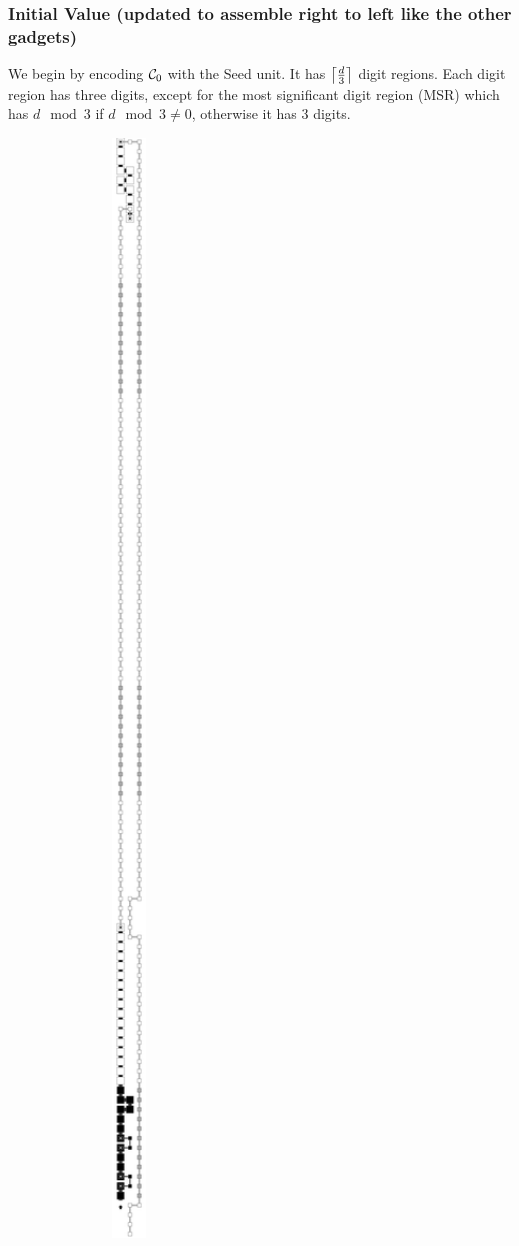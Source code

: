 \subsubsection{Initial Value (updated to assemble right to left like the other gadgets)}
We begin by encoding $\counterstart$ with the Seed unit. It has $\ceil*{\frac{d}{3}}$ digit regions.
Each digit region has three digits, except for the most significant digit region (MSR) which has $d \mod 3$
if $d \mod 3 \not= 0$, otherwise it has 3 digits.

\begin{figure}[H]
    \centering
    \begin{subfigure}[t]{0.24\textwidth}
        \centering
        \includegraphics[width=0.24\textwidth]{initial_value_case1_msr}

\end{subfigure}
\end{figure}
